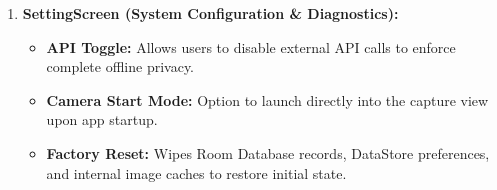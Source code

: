 \begin{enumerate}
    \item \textbf{SettingScreen (System Configuration \& Diagnostics):}
    \begin{itemize}
        \item \textbf{API Toggle:} Allows users to disable external API calls to enforce complete offline privacy.
        \item \textbf{Camera Start Mode:} Option to launch directly into the capture view upon app startup.
        \item \textbf{Factory Reset:} Wipes Room Database records, DataStore preferences, and internal image caches to restore initial state.
    \end{itemize}
\end{enumerate}
